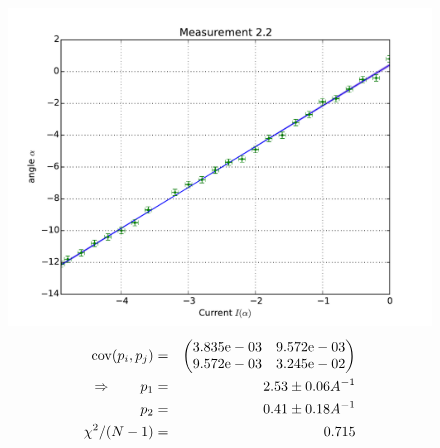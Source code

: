 \begin{figure}
    \begin{centering}
        \includegraphics[width=18cm]{figures/fig22}
\captionsetup{singlelinecheck=off} 
\caption[.]{
\begin{eqnarray*}
    \mathrm{cov}(p_i, p_j) &=& 
    \begin{pmatrix}
        3.835\mathrm{e}-03 &9.572\mathrm{e}-03 \\
        9.572\mathrm{e}-03 &3.245\mathrm{e}-02 \\
    \end{pmatrix}
\\ \Rightarrow \qquad
    p_1 &=& 2.53 \pm 0.06 A^{-1}\\
    p_2 &=& 0.41 \pm 0.18 A^{-1} \\
    \chi ^2/(N-1) &=& 0.715
\end{eqnarray*}
}



    \end{centering}
\end{figure}

